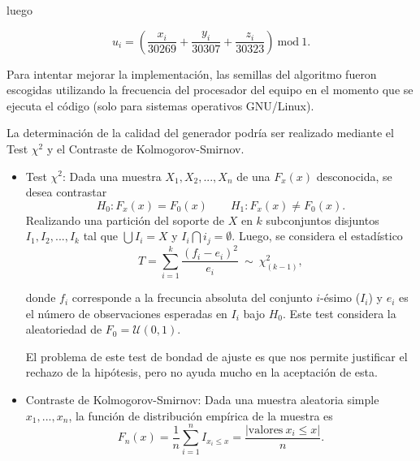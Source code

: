 \documentclass[12pt]{article}
\begin{document}
\begin{enumerate}
        luego 

        \begin{equation}
          u_i = \left(\frac{x_i}{30269} + \frac{y_i}{30307} + \frac{z_i}{30323}\right) ~ \textrm{mod} ~ 1.
        \end{equation}

        Para intentar mejorar la implementación, las semillas del algoritmo fueron escogidas utilizando
        la frecuencia del procesador del equipo en el momento que se ejecuta el código (solo para sistemas
        operativos GNU/Linux). \medskip

        La determinación de la calidad del generador podría ser realizado mediante el Test $\chi^2$ y el 
        Contraste de Kolmogorov-Smirnov.

        \begin{itemize}
          \item Test $\chi^2$: Dada una muestra $X_1, X_2, ..., X_n$ de una $F_x(x)$ desconocida, se desea
            contrastar
            \begin{equation}
              H_0: F_x(x) = F_0(x) \qquad  H_1:F_x(x) \neq F_0(x).
            \end{equation}
            Realizando una partición del soporte de $X$ en $k$ subconjuntos disjuntos $I_1, I_2, ..., I_k$
            tal que $\bigcup I_i = X$ y $I_i \bigcap i_j = \emptyset$. Luego, se considera el estadístico
            \begin{equation}
              T = \sum_{i=1}^k \frac{(f_i - e_i)^2}{e_i} ~ \sim ~ \chi^2_{(k-1)},
            \end{equation}

            donde $f_i$ corresponde a la frecuncia absoluta del conjunto $i$-ésimo ($I_i$) y $e_i$ es el 
            número de observaciones esperadas en $I_i$ bajo $H_0$. Este test considera la aleatoriedad
            de $F_0 = \mathcal{U}(0,1)$. \medskip

            El problema de este test de bondad de ajuste es que nos permite justificar el rechazo de 
            la hipótesis, pero no ayuda mucho en la aceptación de esta.

          \item Contraste de Kolmogorov-Smirnov: Dada una muestra aleatoria simple $x_1, ..., x_n$, la 
            función de distribución empírica de la muestra es
            \begin{equation}
              F_n(x) = \frac1n \sum_{i=1}^n I_{x_i \leq x} = \frac{|\textrm{valores} ~ x_i \leq x|}{n}.
            \end{equation}


\end{itemize}
\end{enumerate}
\end{document}
